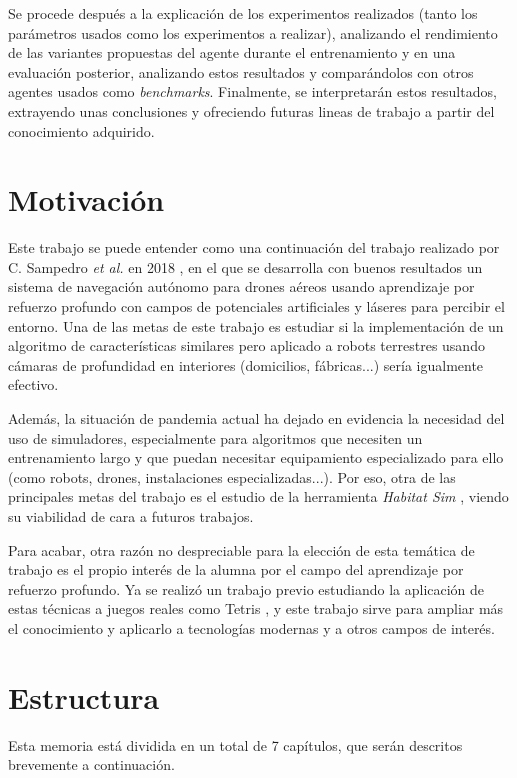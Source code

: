 Se procede después a la explicación de los experimentos realizados (tanto los parámetros usados como los experimentos a realizar), analizando el rendimiento de las variantes propuestas del agente durante el entrenamiento y en una evaluación posterior, analizando estos resultados y comparándolos con otros agentes usados como \textit{benchmarks}. Finalmente, se interpretarán estos resultados, extrayendo unas conclusiones y ofreciendo futuras lineas de trabajo a partir del conocimiento adquirido.

\section{Motivación}

Este trabajo se puede entender como una continuación del trabajo realizado por C. Sampedro \textit{et al.} en 2018 \cite{Sampedro2018}, en el que se desarrolla con buenos resultados un sistema de navegación autónomo para drones aéreos usando aprendizaje por refuerzo profundo con campos de potenciales artificiales y láseres para percibir el entorno. Una de las metas de este trabajo es estudiar si la implementación de un algoritmo de características similares pero aplicado a robots terrestres usando cámaras de profundidad en interiores (domicilios, fábricas...) sería igualmente efectivo.

Además, la situación de pandemia actual ha dejado en evidencia la necesidad del uso de simuladores, especialmente para algoritmos que necesiten un entrenamiento largo y que puedan necesitar equipamiento especializado para ello (como robots, drones, instalaciones especializadas...). Por eso, otra de las principales metas del trabajo es el estudio de la herramienta \textit{Habitat Sim} \cite{habitat19iccv} \cite{szot2021habitat}, viendo su viabilidad de cara a futuros trabajos.

Para acabar, otra razón no despreciable para la elección de esta temática de trabajo es el propio interés de la alumna por el campo del aprendizaje por refuerzo profundo. Ya se realizó un trabajo previo estudiando la aplicación de estas técnicas a juegos reales como Tetris \cite{Jimenez2020}, y este trabajo sirve para ampliar más el conocimiento y aplicarlo a tecnologías modernas y a otros campos de interés.

\section{Estructura}


Esta memoria está dividida en un total de 7 capítulos, que serán descritos brevemente a continuación.


